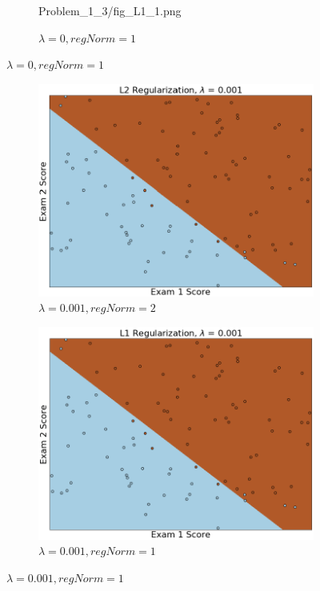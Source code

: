 \documentclass{article}
\begin{document}
\begin{enumerate}
\begin{figure}[h!]
\begin{subfigure}[b]{0.44\textwidth}
         	{Problem_1_3/fig_L1_1.png}
         	\caption{$\lambda = 0, regNorm = 1$}
         	\label{fig:L1_1}
     	\end{subfigure}
		\end{figure}
		
    	\begin{figure}[h!]
     	\centering
     	\begin{subfigure}[b]{0.44\textwidth}
         	\centering
         	\includegraphics[width=\textwidth]
         	{Problem_1_3/fig_L2_2.png}
         	\caption{$\lambda = 0.001, regNorm = 2$}
         	\label{fig:L2_2}
     	\end{subfigure}
     	\hfill
     	\begin{subfigure}[b]{0.44\textwidth}
         	\centering
         	\includegraphics[width=\textwidth]
         	{Problem_1_3/fig_L1_2.png}
         	\caption{$\lambda = 0.001, regNorm = 1$}
         	\label{fig:L1_2}
     	\end{subfigure}
		\end{figure}
		

\end{enumerate}
\end{document}
